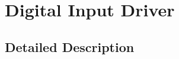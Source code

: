 \hypertarget{group__digital__input__driver}{\section{Digital Input Driver}
\label{group__digital__input__driver}
}


\subsection{Detailed Description}
